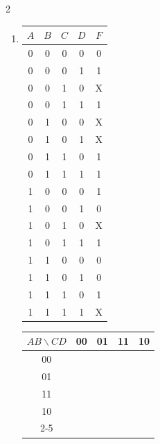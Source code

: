 \documentclass[12pt,a4paper]{article}
\begin{document}
\begin{multicols}{2}
\begin{enumerate}[label=\alph*)]
  \item \begin{minipage}[t]{\linewidth}
    \begin{center}
      \begin{tabular}{cccc|c}
        \toprule
        $A$ & $B$ & $C$ & $D$ & $F$ \\
        \midrule
        0 & 0 & 0 & 0 & 0 \\
        0 & 0 & 0 & 1 & 1 \\
        0 & 0 & 1 & 0 & X \\
        0 & 0 & 1 & 1 & 1 \\
        0 & 1 & 0 & 0 & X \\
        0 & 1 & 0 & 1 & X \\
        0 & 1 & 1 & 0 & 1 \\
        0 & 1 & 1 & 1 & 1 \\
        1 & 0 & 0 & 0 & 1 \\
        1 & 0 & 0 & 1 & 0 \\
        1 & 0 & 1 & 0 & X \\
        1 & 0 & 1 & 1 & 1 \\
        1 & 1 & 0 & 0 & 0 \\
        1 & 1 & 0 & 1 & 0 \\
        1 & 1 & 1 & 0 & 1 \\
        1 & 1 & 1 & 1 & X \\
        \bottomrule
      \end{tabular}
    \end{center}

    \begin{center}
      \begin{tabular}{c|c|c|c|c|}
        $AB \backslash CD$ & 00 & 01 & 11 & \multicolumn{1}{c}{10} \\
        \hline
        00 & \phantom{0} & \phantom{0} & \phantom{0} & \phantom{0} \\
        \hline
        01 & \phantom{0} & \phantom{0} & \phantom{0} & \phantom{0} \\
        \hline
        11 & \phantom{0} & \phantom{0} & \phantom{0} & \phantom{0} \\
        \hline
        10 & \phantom{0} & \phantom{0} & \phantom{0} & \phantom{0} \\
        \cline{2-5}
      \end{tabular}
    \end{center}
  \end{minipage}

\end{enumerate}
\end{multicols}
\end{document}
